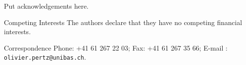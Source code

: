 \documentclass{nature}
\begin{document}
%


\begin{addendum}
 \item Put acknowledgements here.
 \item[Competing Interests] The authors declare that they have no
competing financial interests.
 \item[Correspondence] Phone: +41 61 267 22 03; Fax: +41 61 267 35 66; E-mail : \texttt{olivier.pertz@unibas.ch}.
\end{addendum}
\end{document}
